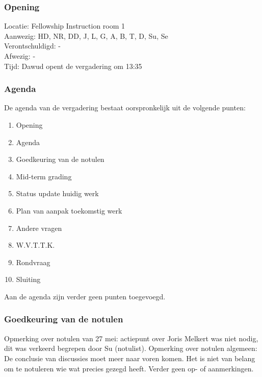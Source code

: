 \subsubsection{Opening}
Locatie: Fellowship Instruction room 1\\
Aanwezig: HD, NR, DD, J, L, G, A, B, T, D, Su, Se\\
Verontschuldigd: - \\
Afwezig: - \\
Tijd: Dawud opent de vergadering om 13:35\\

\subsubsection{Agenda}
De agenda van de vergadering bestaat oorspronkelijk uit de volgende punten:
\begin{enumerate}
\item Opening
\item Agenda
\item Goedkeuring van de notulen
\item Mid-term grading
\item Status update huidig werk
\item Plan van aanpak toekomstig werk
\item Andere vragen
\item W.V.T.T.K.
\item Rondvraag
\item Sluiting
\end{enumerate}

Aan de agenda zijn verder geen punten toegevoegd.

\subsubsection{Goedkeuring van de notulen}
Opmerking over notulen van 27 mei: actiepunt over Joris Melkert was niet nodig, dit was verkeerd begrepen door Su (notulist).
Opmerking over notulen algemeen: De conclusie van discussies moet meer naar voren komen. Het is niet van belang om te notuleren wie wat precies gezegd heeft.
Verder geen op- of aanmerkingen.

